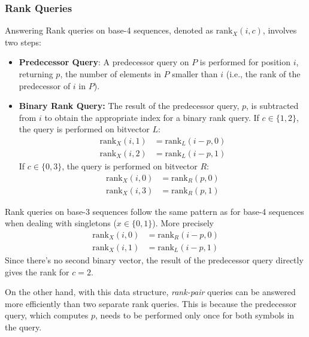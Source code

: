 \subsubsection*{Rank Queries}

Answering Rank queries on base-4 sequences, denoted as \(\textrm{rank}_X(i, c)\), involves two steps:

\begin{itemize}
    \item \textbf{Predecessor Query}: A predecessor query on \(P\) is performed for position \(i\), returning \(p\), the number of elements in \(P\) smaller than \(i\) (i.e., the rank of the predecessor of \(i\) in \(P\)).

    \item \textbf{Binary Rank Query:}  The result of the predecessor query, \(p\), is subtracted from \(i\) to obtain the appropriate index for a binary rank query. If \(c \in \{1, 2\}\), the query is performed on bitvector \(L\):
          \begin{align}
              \textrm{rank}_X(i, 1) & = \textrm{rank}_L(i-p, 0) \\
              \textrm{rank}_X(i, 2) & = \textrm{rank}_L(i-p, 1)
          \end{align}
          If \(c \in \{0, 3\}\), the query is performed on bitvector \(R\):
          \begin{align}
              \textrm{rank}_X(i, 0) & = \textrm{rank}_R(p, 0) \\
              \textrm{rank}_X(i, 3) & = \textrm{rank}_R(p, 1)
          \end{align}
\end{itemize}

\noindent Rank queries on base-3 sequences follow the same pattern as for base-4 sequences when dealing with singletons (\(x \in \{0,1\}\)). More precisely
\begin{align}
    \textrm{rank}_X(i, 0) & = \textrm{rank}_R(i-p, 0) \\
    \textrm{rank}_X(i, 1) & = \textrm{rank}_L(i-p, 1)
\end{align}
\noindent Since there's no second binary vector, the result of the predecessor query directly gives the rank for \(c=2\). \vspace{0.4cm}

\noindent On the other hand, with this data structure, \emph{rank-pair} queries can be answered more efficiently than two separate rank queries. This is because the predecessor query, which computes \(p\), needs to be performed only once for both symbols in the query.


